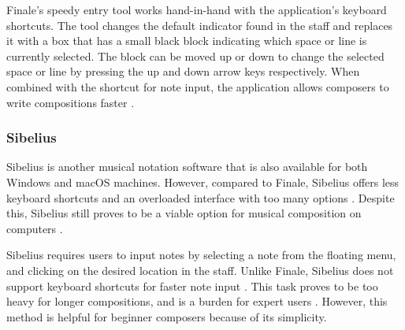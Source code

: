 		Finale's speedy entry tool works hand-in-hand with the application's keyboard shortcuts. The tool changes the default indicator found in the staff and replaces it with a box that has a small black block indicating which space or line is currently selected. The block can be moved up or down to change the selected space or line by pressing the up and down arrow keys respectively. When combined with the shortcut for note input, the application allows composers to write compositions faster \citep{knoder2017finale}.
		
        
        
		\subsubsection{Sibelius}
        
        Sibelius is another musical notation software that is also available for both Windows and macOS machines. However, compared to Finale, Sibelius offers less keyboard shortcuts and an overloaded interface with too many options \citep{hess2008sibeliusvsfinale}. Despite this, Sibelius still proves to be a viable option for musical composition on computers \citep{knoder2017sibelius}.
        
        
        Sibelius requires users to input notes by selecting a note from the floating menu, and clicking on the desired location in the staff. Unlike Finale, Sibelius does not support keyboard shortcuts for faster note input \citep{knoder2017sibelius}. This task proves to be too heavy for longer compositions, and is a burden for expert users \citep{hess2008sibeliusvsfinale}. However, this method is helpful for beginner composers because of its simplicity.
        
